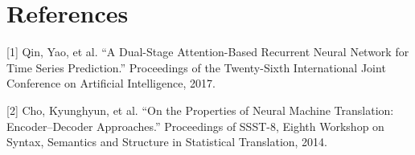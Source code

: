 \documentclass{article}
\begin{document}
\newpage
\section*{References}
[1] Qin, Yao, et al. “A Dual-Stage Attention-Based Recurrent Neural Network for
Time Series Prediction.” Proceedings of the Twenty-Sixth International Joint
Conference on Artificial Intelligence, 2017.

[2] Cho, Kyunghyun, et al. “On the Properties of Neural Machine Translation:
Encoder–Decoder Approaches.” Proceedings of SSST-8, Eighth Workshop on Syntax,
Semantics and Structure in Statistical Translation, 2014.
\end{document}
